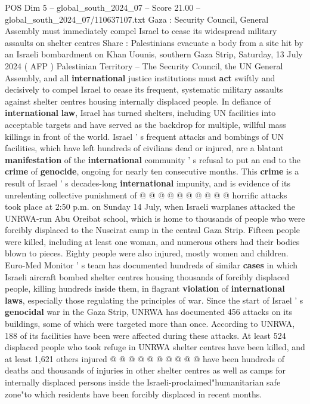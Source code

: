 \begin{textsample}{POS Dim 5 – global\_south\_2024\_07 – Score 21.00 – global\_south\_2024\_07/110637107.txt}  \label{ex:f5_pos_161}
Gaza : Security Council, General Assembly must immediately compel Israel to cease its widespread military assaults on shelter centres Share : Palestinians evacuate a body from a site hit by an Israeli bombardment on Khan Uounis, southern Gaza Strip, Saturday, 13 July 2024 ( AFP ) Palestinian Territory -- The Security Council, the UN General Assembly, and all \textbf{international} justice institutions must \textbf{act} swiftly and decisively to compel Israel to cease its frequent, systematic military assaults against shelter centres housing internally displaced people.
In defiance of \textbf{international} \textbf{law}, Israel has turned shelters, including UN facilities into acceptable targets and have served as the backdrop for multiple, willful mass killings in front of the world.
Israel ' s frequent attacks and bombings of UN facilities, which have left hundreds of civilians dead or injured, are a blatant \textbf{manifestation} of the \textbf{international} community ' s refusal to put an end to the \textbf{crime} of \textbf{genocide}, ongoing for nearly ten consecutive months.
This \textbf{crime} is a result of Israel ' s decades-long \textbf{international} impunity, and is evidence of its unrelenting collective punishment of @ @ @ @ @ @ @ @ @ @ horrific attacks took place at 2:50 p.m. on Sunday 14 July, when Israeli warplanes attacked the UNRWA-run Abu Oreibat school, which is home to thousands of people who were forcibly displaced to the Nuseirat camp in the central Gaza Strip.
Fifteen people were killed, including at least one woman, and numerous others had their bodies blown to pieces.
Eighty people were also injured, mostly women and children.
Euro-Med Monitor ' s team has documented hundreds of similar \textbf{cases} in which Israeli aircraft bombed shelter centres housing thousands of forcibly displaced people, killing hundreds inside them, in flagrant \textbf{violation} of \textbf{international} \textbf{laws}, especially those regulating the principles of war.
Since the start of Israel ' s \textbf{genocidal} war in the Gaza Strip, UNRWA has documented 456 attacks on its buildings, some of which were targeted more than once.
According to UNRWA, 188 of its facilities have been were affected during these attacks.
At least 524 displaced people who took refuge in UNRWA shelter centres have been killed, and at least 1,621 others injured @ @ @ @ @ @ @ @ @ @ have been hundreds of deaths and thousands of injuries in other shelter centres as well as camps for internally displaced persons inside the Israeli-proclaimed"humanitarian safe zone"to which residents have been forcibly displaced in recent months.

\end{textsample}
